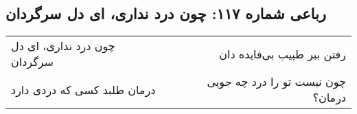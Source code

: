 \begin{center}
\section*{رباعی شماره ۱۱۷: چون درد نداری، ای دل سرگردان}
\label{sec:117}
\begin{longtable}{l p{0.5cm} r}
چون درد نداری، ای دل سرگردان
&&
رفتن ببر طبیب بی‌فایده دان
\\
درمان طلبد کسی که دردی دارد
&&
چون نیست تو را درد چه جویی درمان؟
\\
\end{longtable}
\end{center}
